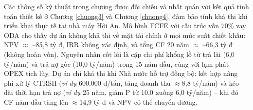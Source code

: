 \documentclass[../main.tex]{subfiles}
\begin{document}
Các thông số kỹ thuật trong chương được đối chiếu và nhất quán với kết quả tính toán thiết kế ở Chương \ref{chuong3} và Chương \ref{chuong4}, đảm bảo tính khả thi khi triển khai thực tế tại nhà máy Hội An. Mô hình FCFE với cấu trúc vốn 70\% vay ODA cho thấy dự án không khả thi về mặt tài chính ở mọi mức suất chiết khấu: NPV $\approx$ --85{,}8 tỷ đ, IRR không xác định, và tổng CF 20 năm $\approx$ --66{,}3 tỷ đ (không hoàn vốn). Nguyên nhân cốt lõi là cặp chi phí khổng lồ từ trả lãi (6{,}0 tỷ/năm) và trả nợ gốc (10{,}0 tỷ/năm) trong 15 năm đầu, cùng với lạm phát OPEX tích lũy. Dự án chỉ khả thi khi Nhà nước hỗ trợ đồng bộ: kết hợp nâng phí xử lý CTRSH (\textit{ví dụ} 600.000 đ/tấn, tăng doanh thu $\approx$8{,}8 tỷ/năm) và kéo dài thời hạn trả nợ (\textit{ví dụ} 25 năm, giảm P từ 10,0 xuống 6,0 tỷ/năm) -- khi đó CF năm đầu tăng lên $\approx$14{,}9 tỷ đ và NPV có thể chuyển dương.
\end{document}
